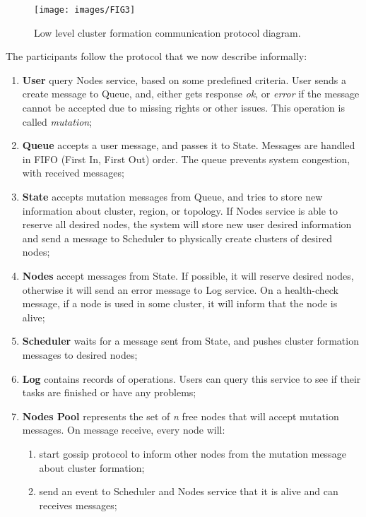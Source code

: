 \begin{figure}[H]
	\begin{center}
		\texttt{[image: images/FIG3]}
	\end{center}
	\vspace{-0.7cm}
	\caption{Low level cluster formation communication protocol diagram.}
	\label{fig:fig7}
\end{figure}

The participants follow the protocol that we now describe informally:

\begin{enumerate}[start=1,label={(\bfseries \arabic*)}]
	\item \label{cluster_formation_informal_description} \textbf{User} query Nodes service, based on some predefined criteria. User sends a create message to Queue, and, either gets response \textit{ok}, or \textit{error} if the message cannot be accepted due to missing rights or other issues. This operation is called \emph{mutation}; 
	\item \textbf{Queue} accepts a user message, and passes it to State. Messages are handled in FIFO (First In, First Out) order. The queue prevents system congestion, with received messages;
	\item \textbf{State} accepts mutation messages from Queue, and tries to store new information about cluster, region, or topology. If Nodes service is able to reserve all desired nodes, the system  will store new user desired information and send a message to Scheduler to physically create clusters of desired nodes;
	\item \textbf{Nodes} accept messages from State. If possible, it will reserve desired nodes, otherwise it will send an error message to Log service. On a health-check message, if a node is used in some cluster, it will inform that the node is alive;
	\item \textbf{Scheduler} waits for a message sent from State, and pushes cluster formation messages to desired nodes;
	\item \textbf{Log} contains records of operations. Users can query this service to see if their tasks are finished or have any problems;
	\item \textbf{Nodes Pool} represents the set of \emph{n} free nodes that will accept mutation messages. 
	On message receive, every node will:
		\begin{enumerate}[start=1,label={(\bfseries \roman*)}] 
			\item start gossip protocol to inform other nodes from the mutation message about cluster formation;
			\item send an event to Scheduler and Nodes service that it is alive and can receives messages;
		\end{enumerate}
\end{enumerate}

